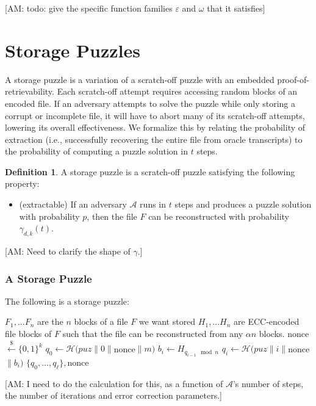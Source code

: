 \documentclass{article}
\newcommand{\anote}[1]{{\color{magenta}[AM: #1]}}
\theoremstyle{definition}
\newtheorem{definition}{Definition}
\theoremstyle{remark}
\newcommand{\hash}{\mathcal{H}}
\newcommand{\Adv}{\mathcal{A}}
\newcommand{\samples}{\overset{\$}{←}}
\begin{document}
\anote{todo: give the specific function families $ε$ and $ω$ that it satisfies}


\section{Storage Puzzles}

A storage puzzle is a variation of a scratch-off puzzle with an embedded proof-of-retrievability. Each scratch-off attempt requires accessing random blocks of an encoded file. If an adversary attempts to solve the puzzle while only storing a corrupt or incomplete file, it will have to abort many of its scratch-off attempts, lowering its overall effectiveness. We formalize this by relating the probability of extraction (i.e., successfully recovering the entire file from oracle transcripts) to the probability of computing a puzzle solution in $t$ steps.

\begin{definition} A storage puzzle is a scratch-off puzzle satisfying the following property:
\begin{itemize}
\item (extractable) If an adversary $\Adv$ runs in $t$ steps and produces a puzzle solution with probability $p$, then the file $F$ can be reconstructed with probability $γ_{d,k}(t)$.
\end{itemize}
\end{definition}
\anote{Need to clarify the shape of $γ$.}

\subsubsection{A Storage Puzzle}

The following is a storage puzzle:

\begin{algorithmic}[0]
 \State $F_1,...F_n$ are the $n$ blocks of a file $F$ we want stored
 \State $H_1,...H_n$ are ECC-encoded file blocks of $F$ such that the file can be reconstructed from any $αn$ blocks.
   \State nonce $\samples \{0,1\}^k$
   \State $q_0 ← \hash(puz ∥ 0 ∥ $nonce$ ∥ m)$
      \State $b_i ← H_{q_{i-1} \mod n}$
      \State $q_i ← \hash(puz ∥ i ∥ $nonce$ ∥ b_i)$
   \EndFor
   \State \Return $\{q_0,...,q_ℓ\}, $nonce
  \EndFunction
\end{algorithmic}
\anote{I need to do the calculation for this, as a function of $\Adv$'s number of steps, the number of iterations and error correction parameters.}
\end{document}
